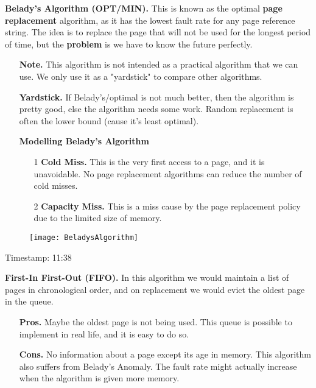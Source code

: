 \documentclass[12pt]{article}
\begin{document}
{\bf Belady's Algorithm (OPT/MIN).} {This is known as the optimal {\bf page replacement} algorithm, as it has the lowest fault rate for any page reference string. The idea is to replace the page that will not be used for the longest period of time, but the {\bf problem} is we have to know the future perfectly.}
    \begin{enumerate}
        \item[]{\bf Note.} {This algorithm is not intended as a practical algorithm that we can use. We only use it as a "yardstick" to compare other algorithms.}
        \item[]{\bf Yardstick.} {If Belady's/optimal is not much better, then the algorithm is pretty good, else the algorithm needs some work. Random replacement is often the lower bound (cause it's least optimal).} 
        \item[]{\bf Modelling Belady's Algorithm}
        \begin{enumerate}
            \item[1]{\bf Cold Miss.} {This is the very first access to a page, and it is unavoidable. No page replacement algorithms can reduce the number of cold misses.}
            \item[2]{\bf Capacity Miss.} {This is a miss cause by the page replacement policy due to the limited size of memory.}  
        \end{enumerate} 
    \end{enumerate}
\begin{figure}[htbp]
  \centering
  \texttt{[image: BeladysAlgorithm]} 
\end{figure}

Timestamp: 11:38

{\bf First-In First-Out (FIFO).} {In this algorithm we would maintain a list of pages in chronological order, and on replacement we would evict the oldest page in the queue.}
    \begin{enumerate}
        \item[]{\bf Pros.} {Maybe the oldest page is not being used. This queue is possible to implement in real life, and it is easy to do so.}
        \item[]{\bf Cons.} {No information about a page except its age in memory. This algorithm also suffers from Belady's Anomaly. The fault rate might actually increase when the algorithm is given more memory.} 
    \end{enumerate}
\end{document}
